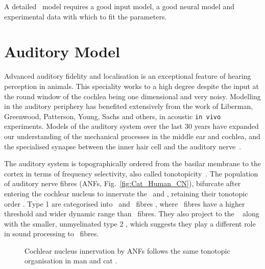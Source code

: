 
A detailed \BNN~model requires a good input model, a good neural model and experimental data with which to fit the parameters.  

\section{Auditory Model    \label{sec:CN:auditory-model}}

Advanced auditory fidelity and localisation is an exceptional feature of hearing perception in animals.  
This speciality works to a high degree despite the input at the round window of the cochlea being one dimensional and very noisy.
Modelling in the auditory periphery has benefited extensively from the work of Liberman, Greenwood, Patterson, Young, Sachs and others, in acoustic \texttt{in vivo} experiments. 
Models of the auditory system over the last 30 years have expanded our understanding of the mechanical processes in the middle ear and cochlea, and the specialised synapse between the inner hair cell and the auditory nerve~\citep{DavisVoigt:1991,Carney:1993,MeddisHewittEtAl:1990}.


The auditory system is topographically ordered from the basilar membrane to the cortex in terms of frequency selectivity, also called tonotopicity~\citep{YoungOertel:2004}.
The population of auditory nerve fibres (ANFs, Fig.~\ref{fig:Cat_Human_CN}), bifurcate after entering the cochlear nucleus to innervate the \VCN~and \DCN, retaining their tonotopic order \citep{Lorente:1981,Liberman:1982,Liberman:1993}. 
Type 1 \ANFs are categorised into {\HSR}~and {\LSR}~fibres \citep{Liberman:1978}, where \LSR~fibres have a higher threshold and wider dynamic range than \HSR~fibres. 
They also project to the \GCD~\citep{RyugoParks:2003, RyugoHaenggeliEtAl:2003} along with the smaller, unmyelinated type 2 \ANFs, which suggests they play a different role in sound processing to \HSR~fibres.


\begin{figure}[htb]
  \begin{center}
    \caption[Tonotopic innervation by ANFs in the CN of man and cat.]{Cochlear nucleus innervation by ANFs follows the same tonotopic organisation in man and cat  
\citep[!find out which publication printed this!]{RyugoParks:2003,Ryugo:1992,Spoendlin:1973}.}
    \label{fig:CN_Cat_Human}
  \end{center}
\end{figure}


